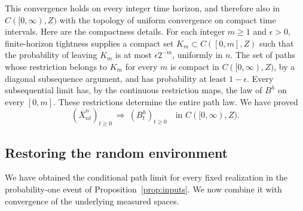 This convergence holds on every integer time horizon, and therefore also
in $C([0,\infty),Z)$ with the topology of uniform convergence on compact
time intervals.  Here are the compactness details.  For each integer
$m\ge1$ and $\epsilon>0$, finite-horizon tightness supplies a compact
set $K_m\subset C([0,m],Z)$ such that the probability of leaving $K_m$
is at most $\epsilon2^{-m}$, uniformly in $n$.  The set of paths whose
restriction belongs to $K_m$ for every $m$ is compact in
$C([0,\infty),Z)$, by a diagonal subsequence argument, and has
probability at least $1-\epsilon$.  Every subsequential limit has, by
the continuous restriction maps, the law of $B^h$ on every $[0,m]$.
These restrictions determine the entire path law.  We have proved
\begin{equation}\label{eq:cable-local-limit}
 (\overline X^n_{nt})_{t\ge0}
 \ \Longrightarrow\ (B^h_t)_{t\ge0}
 \quad\text{in }C([0,\infty),Z).
\end{equation}

\subsection{Restoring the random environment}

We have obtained the conditional path limit for every fixed realization
in the probability-one event of Proposition~\ref{prop:inputs}.  We now
combine it with convergence of the underlying measured spaces.

